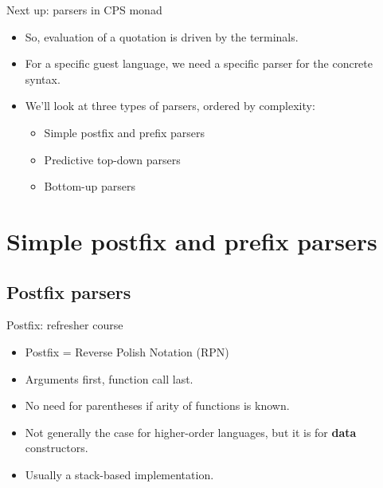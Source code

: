 \documentclass[10pt]{beamer}
\begin{document}
\begin{frame}[fragile]{Next up: parsers in CPS monad}

\begin{itemize}

\item So, evaluation of a quotation is driven by the terminals.
\item For a specific guest language, we need a specific parser for the concrete syntax.
\item We'll look at three types of parsers, ordered by complexity:
\begin{itemize}
\item Simple postfix and prefix parsers
\item Predictive top-down parsers
\item Bottom-up parsers
\end{itemize}

\end{itemize}

\end{frame}

\section{Simple postfix and prefix parsers}

\subsection{Postfix parsers}

\begin{frame}[fragile]{Postfix: refresher course}

\begin{itemize}

\item Postfix = Reverse Polish Notation (RPN)
\item Arguments first, function call last.
\item No need for parentheses if arity of functions is known.
\item Not generally the case for higher-order languages, but it is for \textbf{data} constructors.
\item Usually a stack-based implementation.
\end{itemize}

\end{frame}
\end{document}

